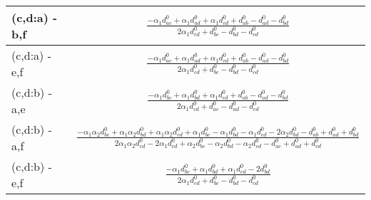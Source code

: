 \documentclass[12pt]{article}
\begin{document}
\begin{longtable}{l|c}
(c,d:a) - b,f& {$\displaystyle \frac{- \alpha_{1} d^{\scriptscriptstyle 0}_{ac} + \alpha_{1} d^{\scriptscriptstyle 0}_{ad} + \alpha_{1} d^{\scriptscriptstyle 0}_{cd} + d^{\scriptscriptstyle 0}_{ab} - d^{\scriptscriptstyle 0}_{ad} - d^{\scriptscriptstyle 0}_{bd}}{2 \alpha_{1} d^{\scriptscriptstyle 0}_{cd} + d^{\scriptscriptstyle 0}_{bc} - d^{\scriptscriptstyle 0}_{bd} - d^{\scriptscriptstyle 0}_{cd}} $}\\[0.4cm]\hline 
(c,d:a) - e,f& {$\displaystyle \frac{- \alpha_{1} d^{\scriptscriptstyle 0}_{ac} + \alpha_{1} d^{\scriptscriptstyle 0}_{ad} + \alpha_{1} d^{\scriptscriptstyle 0}_{cd} + d^{\scriptscriptstyle 0}_{ab} - d^{\scriptscriptstyle 0}_{ad} - d^{\scriptscriptstyle 0}_{bd}}{2 \alpha_{1} d^{\scriptscriptstyle 0}_{cd} + d^{\scriptscriptstyle 0}_{bc} - d^{\scriptscriptstyle 0}_{bd} - d^{\scriptscriptstyle 0}_{cd}} $}\\[0.4cm]\hline 
(c,d:b) - a,e& {$\displaystyle \frac{- \alpha_{1} d^{\scriptscriptstyle 0}_{bc} + \alpha_{1} d^{\scriptscriptstyle 0}_{bd} + \alpha_{1} d^{\scriptscriptstyle 0}_{cd} + d^{\scriptscriptstyle 0}_{ab} - d^{\scriptscriptstyle 0}_{ad} - d^{\scriptscriptstyle 0}_{bd}}{2 \alpha_{1} d^{\scriptscriptstyle 0}_{cd} + d^{\scriptscriptstyle 0}_{ac} - d^{\scriptscriptstyle 0}_{ad} - d^{\scriptscriptstyle 0}_{cd}} $}\\[0.4cm]\hline 
(c,d:b) - a,f& {$\displaystyle \frac{- \alpha_{1} \alpha_{2} d^{\scriptscriptstyle 0}_{bc} + \alpha_{1} \alpha_{2} d^{\scriptscriptstyle 0}_{bd} + \alpha_{1} \alpha_{2} d^{\scriptscriptstyle 0}_{cd} + \alpha_{1} d^{\scriptscriptstyle 0}_{bc} - \alpha_{1} d^{\scriptscriptstyle 0}_{bd} - \alpha_{1} d^{\scriptscriptstyle 0}_{cd} - 2 \alpha_{2} d^{\scriptscriptstyle 0}_{bd} - d^{\scriptscriptstyle 0}_{ab} + d^{\scriptscriptstyle 0}_{ad} + d^{\scriptscriptstyle 0}_{bd}}{2 \alpha_{1} \alpha_{2} d^{\scriptscriptstyle 0}_{cd} - 2 \alpha_{1} d^{\scriptscriptstyle 0}_{cd} + \alpha_{2} d^{\scriptscriptstyle 0}_{bc} - \alpha_{2} d^{\scriptscriptstyle 0}_{bd} - \alpha_{2} d^{\scriptscriptstyle 0}_{cd} - d^{\scriptscriptstyle 0}_{ac} + d^{\scriptscriptstyle 0}_{ad} + d^{\scriptscriptstyle 0}_{cd}} $}\\[0.4cm]\hline 
(c,d:b) - e,f& {$\displaystyle \frac{- \alpha_{1} d^{\scriptscriptstyle 0}_{bc} + \alpha_{1} d^{\scriptscriptstyle 0}_{bd} + \alpha_{1} d^{\scriptscriptstyle 0}_{cd} - 2 d^{\scriptscriptstyle 0}_{bd}}{2 \alpha_{1} d^{\scriptscriptstyle 0}_{cd} + d^{\scriptscriptstyle 0}_{bc} - d^{\scriptscriptstyle 0}_{bd} - d^{\scriptscriptstyle 0}_{cd}} $}\\[0.4cm]\hline 

\end{longtable}
\end{document}
